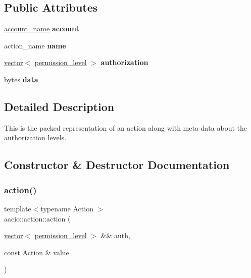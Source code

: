 \subsection*{Public Attributes}
\begin{DoxyCompactItemize}
\item 
\mbox{\label{structaacio_1_1action_a3be7c048cb2df1275a9a7d259bf2fbfe}} 
\mbox{\hyperlink{structaacio_1_1chain_1_1name}{account\+\_\+name}} {\bfseries account}
\item 
\mbox{\label{structaacio_1_1action_a451191522149e00aa48a3331bdde22ae}} 
action\+\_\+name {\bfseries name}
\item 
\mbox{\label{structaacio_1_1action_afb302a0fd6a90a459677d031a55257c4}} 
\mbox{\hyperlink{classstd_1_1vector}{vector}}$<$ \mbox{\hyperlink{structaacio_1_1permission__level}{permission\+\_\+level}} $>$ {\bfseries authorization}
\item 
\mbox{\label{structaacio_1_1action_af06172b83a4c46ba1801c9d848b47e23}} 
\mbox{\hyperlink{classstd_1_1vector}{bytes}} {\bfseries data}
\end{DoxyCompactItemize}


\subsection{Detailed Description}
This is the packed representation of an action along with meta-\/data about the authorization levels. 

\subsection{Constructor \& Destructor Documentation}
\mbox{\label{structaacio_1_1action_a4f3fa4d4b99bb0d105dd9349e8f84da1}} 
\subsubsection{\texorpdfstring{action()}{action()}\hspace{0.1cm}{\footnotesize\ttfamily [1/4]}}
{\footnotesize\ttfamily template$<$typename Action $>$ \\
aacio\+::action\+::action (\begin{DoxyParamCaption}\item[{\mbox{\hyperlink{classstd_1_1vector}{vector}}$<$ \mbox{\hyperlink{structaacio_1_1permission__level}{permission\+\_\+level}} $>$ \&\&}]{auth,  }\item[{const Action \&}]{value }\end{DoxyParamCaption})\hspace{0.3cm}{\ttfamily [inline]}}


